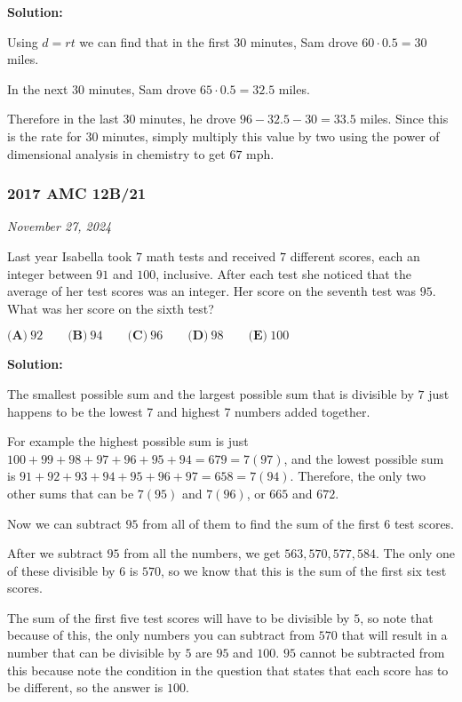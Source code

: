 \documentclass[../mathproblems.tex]{subfiles}
\begin{document}
\textbf{Solution:}

Using $d=rt$ we can find that in the first $30$ minutes, Sam drove $60\cdot 0.5 = 30$ miles.

In the next $30$ minutes, Sam drove $65 \cdot 0.5 = 32.5$ miles.

Therefore in the last 30 minutes, he drove $96-32.5-30=33.5$ miles. Since this is the rate for 30 minutes, simply multiply this value by two using the power of dimensional analysis in chemistry to get $\boxed{67}$ mph.

\noindent\hrulefill
\subsubsection*{2017 AMC 12B/21} 

\textit{November 27, 2024}

Last year Isabella took $7$ math tests and received $7$ different scores, each an integer between $91$ and $100$, inclusive. After each test she noticed that the average of her test scores was an integer. Her score on the seventh test was $95$. What was her score on the sixth test?

$\textbf{(A)}\ 92\qquad\textbf{(B)}\ 94\qquad\textbf{(C)}\ 96\qquad\textbf{(D)}\ 98\qquad\textbf{(E)}\ 100$

\textbf{Solution:}

The smallest possible sum and the largest possible sum that is divisible by $7$ just happens to be the lowest 7 and highest 7 numbers added together.

For example the highest possible sum is just $100+99+98+97+96+95+94 = 679 = 7(97)$, and the lowest possible sum is $91+92+93+94+95+96+97 = 658 = 7(94)$. Therefore, the only two other sums that can be $7(95)$ and $7(96)$, or $665$ and $672$.

Now we can subtract $95$ from all of them to find the sum of the first $6$ test scores.

After we subtract $95$ from all the numbers, we get $563, 570, 577, 584$. The only one of these divisible by $6$ is $570$, so we know that this is the sum of the first six test scores.

The sum of the first five test scores will have to be divisible by $5$, so note that because of this, the only numbers you can subtract from $570$ that will result in a number that can be divisible by $5$ are $95$ and $100$. $95$ cannot be subtracted from this because note the condition in the question that states that each score has to be different, so the answer is $\boxed{100}$.
\end{document}
